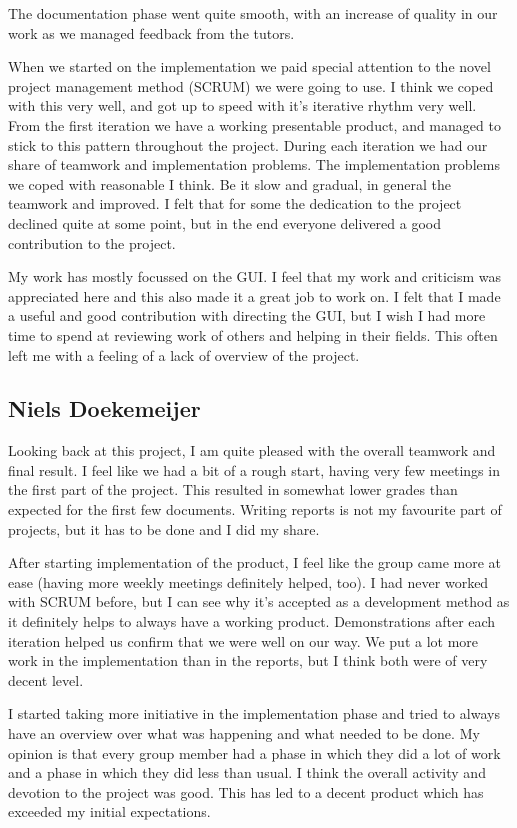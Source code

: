 \documentclass[a4paper]{article}
\begin{document}
The documentation phase went quite smooth, with an increase of quality in our work as we managed feedback from the tutors.

When we started on the implementation we paid special attention to the novel project management method (SCRUM) we were going to use. I think we coped with this very well, and got up to speed with it's iterative rhythm very well. From the first iteration we have a working presentable product, and managed to stick to this pattern throughout the project. During each iteration we had our share of teamwork and implementation problems. The implementation problems we coped with reasonable I think. Be it slow and gradual, in general the teamwork and improved. I felt that for some the dedication to the project declined quite at some point, but in the end everyone delivered a good contribution to the project.

My work has mostly focussed on the GUI. I feel that my work and criticism was appreciated here and this also made it a great job to work on. I felt that I made a useful and good contribution with directing the GUI, but I wish I had more time to spend at reviewing work of others and helping in their fields. This often left me with a feeling of a lack of overview of the project. 
\subsection{Niels Doekemeijer}
Looking back at this project, I am quite pleased with the overall teamwork and final result. I feel like we had a bit of a rough start, having very few meetings in the first part of the project. This resulted in somewhat lower grades than expected for the first few documents. Writing reports is not my favourite part of projects, but it has to be done and I did my share.

After starting implementation of the product, I feel like the group came more at ease (having more weekly meetings definitely helped, too). I had never worked with SCRUM before, but I can see why it's accepted as a development method as it definitely helps to always have a working product. Demonstrations after each iteration helped us confirm that we were well on our way. We put a lot more work in the implementation than in the reports, but I think both were of very decent level.

I started taking more initiative in the implementation phase and tried to always have an overview over what was happening and what needed to be done. My opinion is that every group member had a phase in which they did a lot of work and a phase in which they did less than usual. I think the overall activity and devotion to the project was good. This has led to a decent product which has exceeded my initial expectations.
\end{document}
